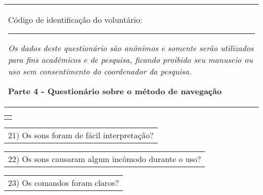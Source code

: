 \begin{table}[!thb]
    \begin{tabular}{m{1\linewidth}}

        {\color{gray}
        
        Código de identificação do voluntário: \rule{1in}{.2mm}
        
        \textit{Os dados deste questionário são anônimos e somente serão utilizados para fins acadêmicos e de pesquisa, ficando proibido seu manuseio ou uso sem consentimento do coordenador da pesquisa.}
        }
        
        \begin{center}
        \textbf{Parte 4 - Questionário sobre o método de navegação}
        \end{center}
        
    \end{tabular}
%
    \begin{tabular}{>{\centering\arraybackslash}m{1\linewidth}}
        {\large TESTE 4 - MISTURADO}
    \end{tabular}


    \begin{tabular}{m{1\linewidth}}
        \vspace{1ex}
        21)	Os sons foram de fácil interpretação?
    \end{tabular}

    
    

    \begin{tabular}{m{1\linewidth}}
        \vspace{1ex}
        22)	Os sons causaram algum incômodo durante o uso?
    \end{tabular}

    
    

    \begin{tabular}{m{1\linewidth}}
        \vspace{1ex}
        23)	Os comandos foram claros?
    \end{tabular}

    
    


\end{table}
